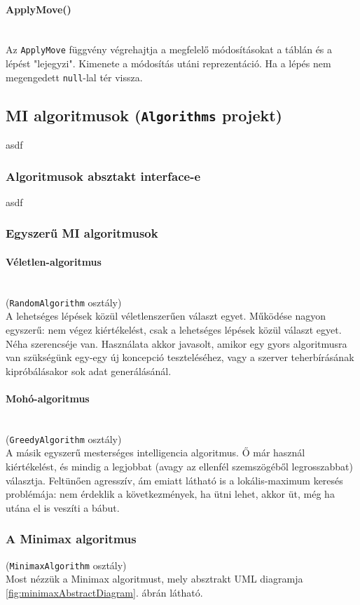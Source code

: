 \documentclass[twoside, a4paper, 12pt]{article}
\begin{document}
\paragraph{ApplyMove()} \mbox{} \\
Az \texttt{ApplyMove} függvény végrehajtja a megfelelő módosításokat a táblán és a lépést "lejegyzi". Kimenete a módosítás utáni reprezentáció. Ha a lépés nem megengedett \texttt{null}-lal tér vissza.


\subsection{MI algoritmusok (\texttt{Algorithms} projekt)}
asdf
\subsubsection{Algoritmusok absztakt interface-e}
asdf
\subsubsection{Egyszerű MI algoritmusok}
\paragraph{Véletlen-algoritmus} \mbox{} \\
\noindent(\texttt{RandomAlgorithm} osztály) \\
A lehetséges lépések közül véletlenszerűen választ egyet. Működése nagyon egyszerű: nem végez kiértékelést, csak a lehetséges lépések közül választ egyet. Néha szerencséje van.
Használata akkor javasolt, amikor egy gyors algoritmusra van szükségünk egy-egy új koncepció teszteléséhez, vagy a szerver teherbírásának kipróbálásakor sok adat generálásánál.

\paragraph{Mohó-algoritmus}  \mbox{} \\
\noindent(\texttt{GreedyAlgorithm} osztály) \\
A másik egyszerű mesterséges intelligencia algoritmus. Ő már használ kiértékelést, és mindig a legjobbat (avagy az ellenfél szemszögéből legrosszabbat) választja. Feltünően agresszív, ám emiatt látható is a lokális-maximum keresés problémája: nem érdeklik a következmények, ha ütni lehet, akkor üt, még ha utána el is veszíti a bábut. 

\subsubsection{A Minimax algoritmus}
\noindent(\texttt{MinimaxAlgorithm} osztály) \\
Most nézzük a Minimax algoritmust, mely absztrakt UML diagramja \ref{fig:minimaxAbstractDiagram}. ábrán látható.
\end{document}

